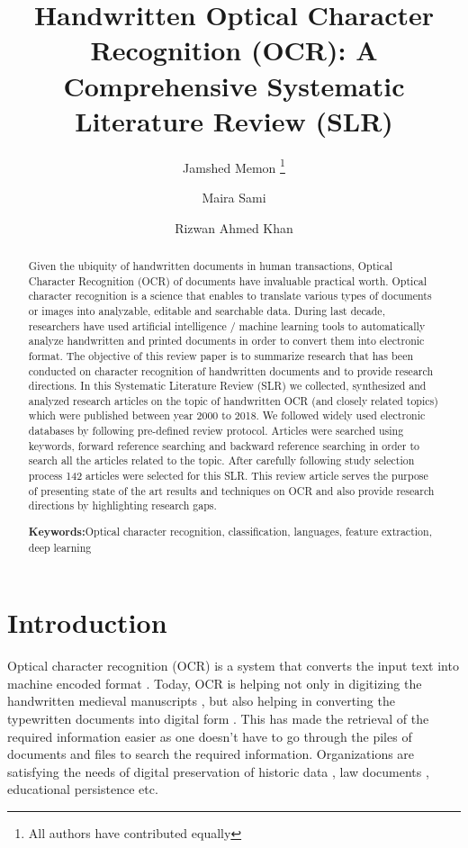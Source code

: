 \documentclass{article}
\title{Handwritten Optical Character Recognition (OCR): A Comprehensive Systematic Literature Review (SLR) }
\author[1,4]{Jamshed Memon \thanks{All authors have contributed equally}}
\author[3]{Maira Sami}
\author[1,2]{Rizwan Ahmed Khan}
\affil[1]{Faculty of IT, Barrett Hodgson University, Karachi, Pakistan.}
\affil[2]{LIRIS, Universit\'e Claude Bernard Lyon1, France.}
\affil[3]{CIS, NED University of Engineering and technology, Karachi, Pakistan.}
\affil[4]{School of Computing, Quest International University, Perak, Malaysia.}
\date{}
\newcommand{\keywords}[1]{\textbf{Keywords:}\quad #1}
\begin{document}
\maketitle










\begin{abstract}

Given the ubiquity of handwritten documents in human transactions, Optical Character Recognition (OCR) of documents have invaluable practical worth. Optical character recognition is a science that enables to translate various types of documents or images into analyzable, editable and searchable data. During last decade, researchers have used artificial intelligence / machine learning tools to automatically analyze handwritten and printed documents in order to convert them into electronic format. The objective of this review paper is to summarize research that has been conducted on character recognition of handwritten documents and to provide research directions. In this Systematic Literature Review (SLR) we collected, synthesized and analyzed research articles on the topic of handwritten OCR (and closely related topics) which were published between year 2000 to 2018. We followed widely used electronic databases by following pre-defined review protocol. Articles were searched using keywords, forward reference searching and backward reference searching in order to search all the articles related to the topic. After carefully following study selection process 142 articles were selected for this SLR. This review article serves the purpose of presenting state of the art results and techniques on OCR and also provide research directions by highlighting research gaps.  





\keywords {Optical character recognition, classification, languages, feature extraction, deep learning}

\end{abstract}




\section{Introduction}
Optical character recognition (OCR) is a system that converts the input text into machine encoded format \cite{Tappert}. Today, OCR is helping not only in digitizing the handwritten medieval manuscripts \cite{Kumar2018}, but also helping in converting the typewritten documents into digital form \cite{Radwan2018}. This has made the retrieval of the required information easier as one doesn’t have to go through the piles of documents and files to search the required information. Organizations are satisfying the needs of digital preservation of historic data \cite{HistMed}, law documents \cite{Ashley2010}, educational persistence \cite{Zanibbi2012} etc. 
\end{document}

